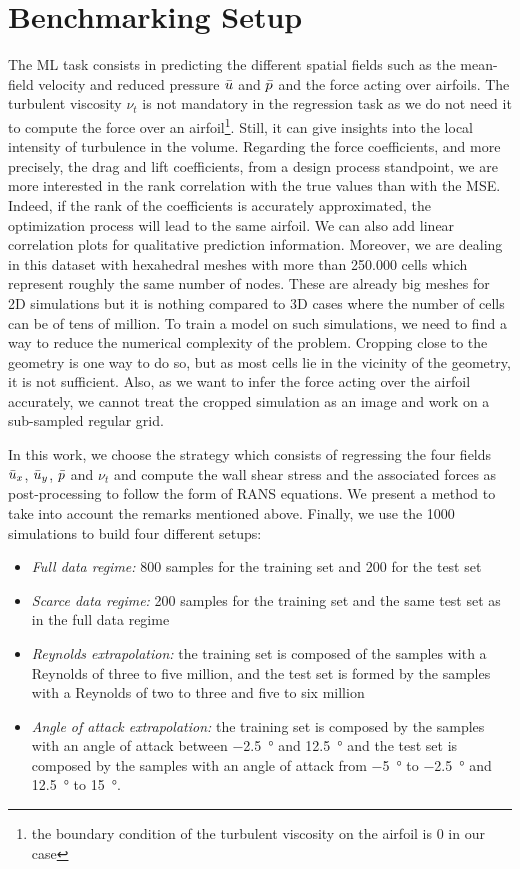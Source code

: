 \section{Benchmarking Setup}\label{sec:setup}
The \acrshort{ML} task consists in predicting the different spatial fields such as the mean-field velocity and reduced pressure $\Bar{u}$ and $\Bar{p}$ and the force acting over airfoils. The turbulent viscosity $\nu_t$ is not mandatory in the regression task as we do not need it to compute the force over an airfoil\footnote{the boundary condition of the turbulent viscosity on the airfoil is 0 in our case}. Still, it can give insights into the local intensity of turbulence in the volume. Regarding the force coefficients, and more precisely, the drag and lift coefficients, from a design process standpoint, we are more interested in the rank correlation with the true values than with the \acrfull{MSE}. Indeed, if the rank of the coefficients is accurately approximated, the optimization process will lead to the same airfoil. We can also add linear correlation plots for qualitative prediction information. Moreover, we are dealing in this dataset with hexahedral meshes with more than \SI{250,000}{} cells which represent roughly the same number of nodes. These are already big meshes for 2D simulations but it is nothing compared to 3D cases where the number of cells can be of tens of million. To train a model on such simulations, we need to find a way to reduce the numerical complexity of the problem. Cropping close to the geometry is one way to do so, but as most cells lie in the vicinity of the geometry, it is not sufficient. Also, as we want to infer the force acting over the airfoil accurately, we cannot treat the cropped simulation as an image and work on a sub-sampled regular grid.

In this work, we choose the strategy which consists of regressing the four fields $\Bar{u}_x$, $\Bar{u}_y$, $\Bar{p}$ and $\nu_t$ and compute the wall shear stress and the associated forces as post-processing to follow the form of \acrshort{RANS} equations. We present a method to take into account the remarks mentioned above. Finally, we use the 1000 simulations to build four different setups:
\begin{itemize}
	\item \emph{Full data regime:} 800 samples for the training set and 200 for the test set
	\item \emph{Scarce data regime:} 200 samples for the training set and the same test set as in the full data regime
	\item \emph{Reynolds extrapolation:} the training set is composed of the samples with a Reynolds of three to five million, and the test set is formed by the samples with a Reynolds of two to three and five to six million
	\item \emph{Angle of attack extrapolation:} the training set is composed by the samples with an angle of attack between \SI{-2.5}{\degree} and \SI{12.5}{\degree} and the test set is composed by the samples with an angle of attack from \SI{-5}{\degree} to \SI{-2.5}{\degree} and \SI{12.5}{\degree} to \SI{15}{\degree}.
\end{itemize}

